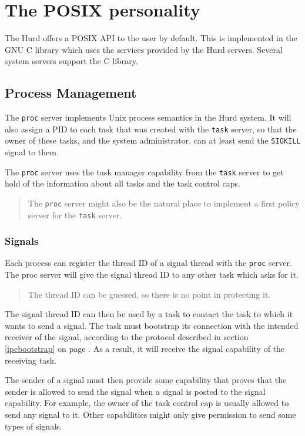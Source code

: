 \documentclass[9pt,a4paper]{extarticle}
\newenvironment{comment}{\footnotesize \begin{quote}}{\end{quote}}
\begin{document}
\section{The POSIX personality}

The Hurd offers a POSIX API to the user by default.  This is
implemented in the GNU C library which uses the services provided by
the Hurd servers.  Several system servers support the C library.


\subsection{Process Management}
\label{proc}

The \texttt{proc} server implements Unix process semantics in the Hurd
system.  It will also assign a PID to each task that was created with
the \texttt{task} server, so that the owner of these tasks, and the
system administrator, can at least send the \verb/SIGKILL/ signal to
them.

The \texttt{proc} server uses the task manager capability from the
\texttt{task} server to get hold of the information about all tasks
and the task control caps.

\begin{comment}
  The \texttt{proc} server might also be the natural place to
  implement a first policy server for the \texttt{task} server.
\end{comment}


\subsubsection{Signals}

Each process can register the thread ID of a signal thread with the
\texttt{proc} server.  The proc server will give the signal thread ID
to any other task which asks for it.

\begin{comment}
  The thread ID can be guessed, so there is no point in protecting it.
\end{comment}

The signal thread ID can then be used by a task to contact the task to
which it wants to send a signal.  The task must bootstrap its
connection with the intended receiver of the signal, according to the
protocol described in section \ref{ipcbootstrap} on page
\pageref{ipcbootstrap}.  As a result, it will receive the signal
capability of the receiving task.

The sender of a signal must then provide some capability that proves
that the sender is allowed to send the signal when a signal is posted
to the signal capability.  For example, the owner of the task control
cap is usually allowed to send any signal to it.  Other capabilities
might only give permission to send some types of signals.
\end{document}
